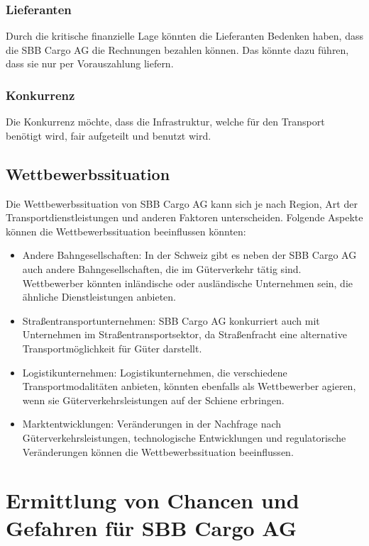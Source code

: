 \documentclass{article}
\begin{document}
\subsubsection{Lieferanten}
Durch die kritische finanzielle Lage könnten die Lieferanten Bedenken haben, dass die SBB Cargo AG die Rechnungen bezahlen können.
Das könnte dazu führen, dass sie nur per Vorauszahlung liefern.

\subsubsection{Konkurrenz}
Die Konkurrenz möchte, dass die Infrastruktur, welche für den Transport benötigt wird, fair aufgeteilt und benutzt wird.


\subsection{Wettbewerbssituation}
Die Wettbewerbssituation von SBB Cargo AG kann sich je nach Region, Art der Transportdienstleistungen und anderen Faktoren unterscheiden.
Folgende Aspekte können die Wettbewerbssituation beeinflussen könnten: 

\begin{itemize}
    \item Andere Bahngesellschaften:
    In der Schweiz gibt es neben der SBB Cargo AG auch andere Bahngesellschaften, die im Güterverkehr tätig sind.
    Wettbewerber könnten inländische oder ausländische Unternehmen sein, die ähnliche Dienstleistungen anbieten. 
    \item Straßentransportunternehmen:
    SBB Cargo AG konkurriert auch mit Unternehmen im Straßentransportsektor, da Straßenfracht eine alternative Transportmöglichkeit für Güter darstellt. 
    \item Logistikunternehmen:
    Logistikunternehmen, die verschiedene Transportmodalitäten anbieten, könnten ebenfalls als Wettbewerber agieren, wenn sie Güterverkehrsleistungen auf der Schiene erbringen.
    \item Marktentwicklungen:
    Veränderungen in der Nachfrage nach Güterverkehrsleistungen, technologische Entwicklungen und regulatorische Veränderungen können die Wettbewerbssituation beeinflussen. 
\end{itemize}

\section{Ermittlung von Chancen und Gefahren für SBB Cargo AG}
\end{document}
